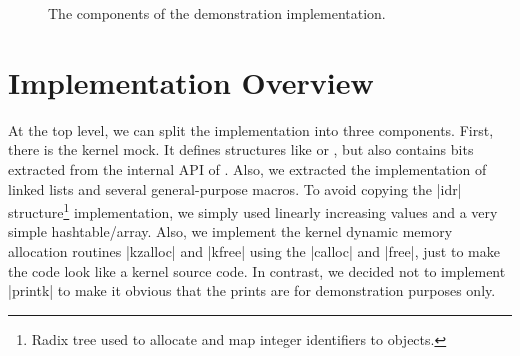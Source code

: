 \begin{figure}
	\centering
	\caption[Components of the demonstrator]{The components of the demonstration implementation.}
	\label{fig:mat-comps}
\end{figure}

\section{Implementation Overview}

At the top level, we can split the implementation into three components. First,
there is the kernel mock. It defines structures like \skb{} or \netdev{}, but
also contains bits extracted from the internal API of . Also, we
extracted the implementation of linked lists and several general-purpose
macros. To avoid copying the \struct|idr| structure\footnote{Radix tree used to
allocate and map integer identifiers to objects.} implementation, we simply
used linearly increasing values and a very simple hashtable/array. Also, we
implement the kernel dynamic memory allocation routines \fnc|kzalloc| and
\fnc|kfree| using the  \fnc|calloc| and \fnc|free|, just to make the
code look like a kernel source code. In contrast, we decided not to implement
\fnc|printk| to make it obvious that the prints are for demonstration purposes
only.

